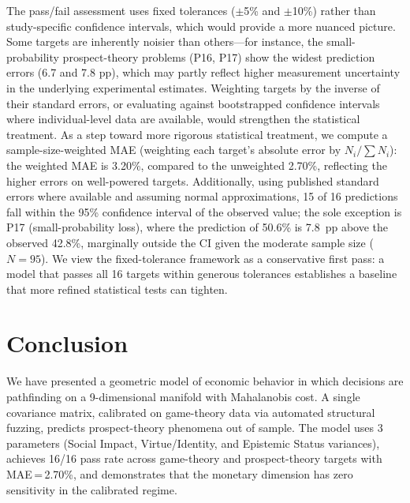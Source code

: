 \documentclass[journal]{IEEEtran}
\begin{document}
\begin{enumerate}
    The pass/fail assessment uses fixed tolerances ($\pm$5\% and $\pm$10\%) rather than study-specific confidence intervals, which would provide a more nuanced picture.
    Some targets are inherently noisier than others---for instance, the small-probability prospect-theory problems (P16, P17) show the widest prediction errors (6.7 and 7.8 pp), which may partly reflect higher measurement uncertainty in the underlying experimental estimates.
    Weighting targets by the inverse of their standard errors, or evaluating against bootstrapped confidence intervals where individual-level data are available, would strengthen the statistical treatment.
    As a step toward more rigorous statistical treatment, we compute a sample-size-weighted MAE (weighting each target's absolute error by $N_i / \sum N_i$): the weighted MAE is 3.20\%, compared to the unweighted 2.70\%, reflecting the higher errors on well-powered targets.
    Additionally, using published standard errors where available and assuming normal approximations, 15 of 16 predictions fall within the 95\% confidence interval of the observed value; the sole exception is P17 (small-probability loss), where the prediction of 50.6\% is 7.8~pp above the observed 42.8\%, marginally outside the CI given the moderate sample size ($N = 95$).
    We view the fixed-tolerance framework as a conservative first pass: a model that passes all 16 targets within generous tolerances establishes a baseline that more refined statistical tests can tighten.
\end{enumerate}


\section{Conclusion}
\label{sec:conclusion}

We have presented a geometric model of economic behavior in which decisions are pathfinding on a 9-dimensional manifold with Mahalanobis cost.
A single covariance matrix, calibrated on game-theory data via automated structural fuzzing, predicts prospect-theory phenomena out of sample.
The model uses 3 parameters (Social Impact, Virtue/Identity, and Epistemic Status variances), achieves 16/16 pass rate across game-theory and prospect-theory targets with MAE\,=\,2.70\%, and demonstrates that the monetary dimension has zero sensitivity in the calibrated regime.
\end{document}
